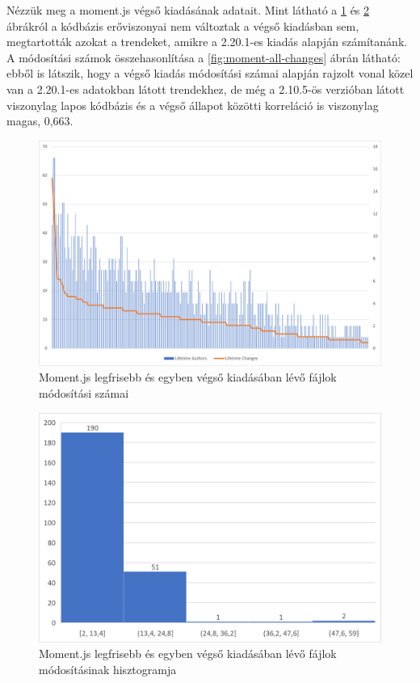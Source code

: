 Nézzük meg a moment.js végső kiadásának adatait. Mint látható a \ref{fig:moment-dev-changes} és \ref{fig:moment-dev-hist} ábrákról a kódbázis erőviszonyai nem változtak a végső kiadásban sem, megtartották azokat a trendeket, amikre a 2.20.1-es kiadás alapján számítanánk. A módosítási számok összehasonlítása a \ref{fig:moment-all-changes} ábrán látható: ebből is látszik, hogy a végső kiadás módosítási számai alapján rajzolt vonal közel van a 2.20.1-es adatokban látott trendekhez, de még a 2.10.5-ös verzióban látott viszonylag lapos kódbázis és a végső állapot közötti korreláció is viszonylag magas, 0,663.

\begin{figure}[H]
    \centering
    \includegraphics[width=1\textwidth]{images/moment/moment-dev-changes.png}
    \caption{Moment.js legfrisebb és egyben végső kiadásában lévő fájlok módosítási számai}
    \label{fig:moment-dev-changes}
\end{figure}

\begin{figure}[H]
    \centering
    \includegraphics[width=1\textwidth]{images/moment/moment-dev-hist.png}
    \caption{Moment.js legfrisebb és egyben végső kiadásában lévő fájlok módosításinak hisztogramja}
    \label{fig:moment-dev-hist}
\end{figure}

